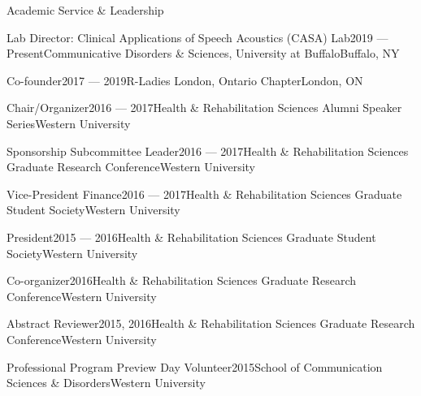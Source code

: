 \documentclass{resume} %
\begin{document}
\begin{rSection}{Academic Service \& Leadership}

	\begin{rSubsection}{Lab Director: Clinical Applications of Speech Acoustics (CASA) Lab}{2019 --- Present}{Communicative Disorders \& Sciences, University at Buffalo}{Buffalo, NY}
	\end{rSubsection}

	\begin{rSubsection}{Co-founder}{2017 --- 2019}{R-Ladies London, Ontario Chapter}{London, ON}
	\end{rSubsection}
	
	\begin{rSubsection}{Chair/Organizer}{2016 --- 2017}{Health \& Rehabilitation Sciences Alumni Speaker Series}{Western University}
	\end{rSubsection}
	
	\begin{rSubsection}{Sponsorship Subcommittee Leader}{2016 --- 2017}{Health \& Rehabilitation Sciences Graduate Research Conference}{Western University}
	\end{rSubsection}
	
	\begin{rSubsection}{Vice-President Finance}{2016 --- 2017}{Health \& Rehabilitation Sciences Graduate Student Society}{Western University}
	\end{rSubsection}
	
	\begin{rSubsection}{President}{2015 --- 2016}{Health \& Rehabilitation Sciences Graduate Student Society}{Western University}
	\end{rSubsection}
	
	\begin{rSubsection}{Co-organizer}{2016}{Health \& Rehabilitation Sciences Graduate Research Conference}{Western University}
	\end{rSubsection}
	
	\begin{rSubsection}{Abstract Reviewer}{2015, 2016}{Health \& Rehabilitation Sciences Graduate Research Conference}{Western University}
	\end{rSubsection}
	
	\begin{rSubsection}{Professional Program Preview Day Volunteer}{2015}{School of Communication Sciences \& Disorders}{Western University}
	\end{rSubsection}



\end{rSection}
\end{document}
